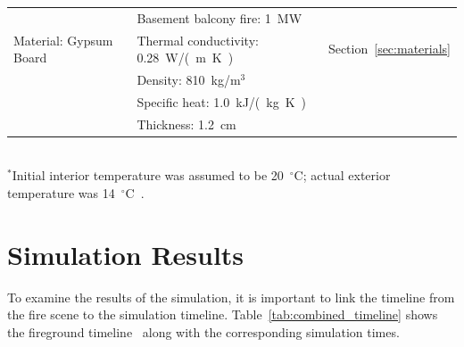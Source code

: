 \documentclass[12pt,oneside]{book}
\begin{document}
\begin{table}[!ht]
\begin{tabular}{lll}
                                                  &  Basement balcony fire: 1~MW                  &                                    \\
Material: Gypsum Board~\cite{WAKILI2007}          &  Thermal conductivity: 0.28~\si{W/(m.K)}      &  Section~\ref{sec:materials}       \\
                                                  &  Density: 810~kg/m$^3$                        &                                    \\
                                                  &  Specific heat: 1.0~\si{kJ/(kg.K)}            &                                    \\
                                                  &  Thickness: 1.2~\si{cm}                       &                                    \\
\bottomrule
\end{tabular}
\footnotesize
\\ $^{*}$Initial interior temperature was assumed to be 20~$^{\circ}$C; actual exterior temperature was 14~$^{\circ}$C~\cite{NIOSH:Bowyer2}.
\normalsize
\label{tab:model_parameters}
\end{table}


\chapter{Simulation Results}
\label{sec:simulation_results}

To examine the results of the simulation, it is important to link the timeline from the fire scene to the simulation timeline. Table~\ref{tab:combined_timeline} shows the fireground timeline~\cite{NIOSH:Bowyer2} along with the corresponding simulation times.
\end{document}

